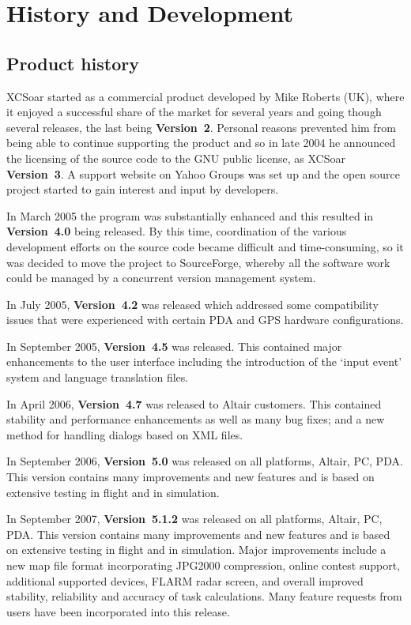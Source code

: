 \chapter{History and Development}\label{cha:history-development}

\section{Product history}

XCSoar started as a commercial product developed by Mike Roberts (UK),
where it enjoyed a successful share of the market for several years
and going though several releases, the last being {\bf Version~2}.
Personal reasons prevented him from being able to continue supporting
the product and so in late 2004 he announced the licensing of the
source code to the GNU public license, as XCSoar {\bf Version~3}.  A support
website on Yahoo Groups was set up and the open source project started
to gain interest and input by developers.

In March 2005 the program was substantially enhanced and this resulted 
in {\bf Version~4.0} being released.  By this time, coordination of
the various development efforts on the source code became difficult
and time-consuming, so it was decided to move the project to
SourceForge, whereby all the software work could be managed by a
concurrent version management system.

In July 2005, {\bf Version~4.2} was released which addressed some
compatibility issues that were experienced with certain PDA and GPS
hardware configurations.

In September 2005, {\bf Version~4.5} was released.  This contained
major enhancements to the user interface including the introduction
of the `input event' system and language translation files.

In April 2006, {\bf Version~4.7} was released to Altair customers.
This contained stability and performance enhancements as well as many
bug fixes; and a new method for handling dialogs based on XML files.

In September 2006, {\bf Version~5.0} was released on all platforms,
Altair, PC, PDA.  This version contains many improvements and new
features and is based on extensive testing in flight and in
simulation.

In September 2007, {\bf Version~5.1.2} was released on all platforms,
Altair, PC, PDA.  This version contains many improvements and new
features and is based on extensive testing in flight and in
simulation.  Major improvements include a new map file format
incorporating JPG2000 compression, online contest support, additional
supported devices, FLARM radar screen, and overall improved stability,
reliability and accuracy of task calculations.  Many feature requests
from users have been incorporated into this release.

